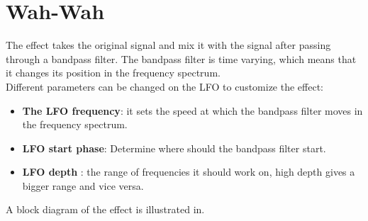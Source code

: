 \section{Wah-Wah}

The effect takes the original signal and mix it with the signal after passing through a bandpass filter. The bandpass filter is time varying, which means that it changes its position in the frequency spectrum. \\
Different parameters can be changed on the LFO to customize the effect:\\

\begin{itemize}
	\item \textbf{The LFO frequency}: it sets the speed at which the bandpass filter moves in the frequency spectrum.
	\item \textbf{LFO start phase}: Determine where should the bandpass filter start.
	\item \textbf{LFO depth} : the range of frequencies it should work on, high depth gives a bigger range and vice versa.
\end{itemize}

A block diagram of the effect is illustrated in.  
